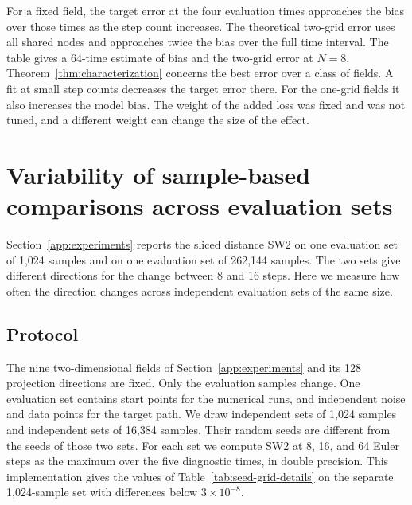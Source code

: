 For a fixed field, the target error at the four evaluation times
approaches the bias over those times as the step count increases. The
theoretical two-grid error uses all shared nodes and approaches twice
the bias over the full time interval. The table gives a 64-time estimate
of bias and the two-grid error at $N=8$. Theorem~\ref{thm:characterization}
concerns the best error over a class of fields. A fit at small step counts
decreases the target error there. For the one-grid fields it also
increases the model bias. The weight of the added loss was fixed and
was not tuned, and a different weight can change the size of the
effect.

\begin{table}[ht]
\centering
\caption{Learned scalar fields: target error at $N$ Euler steps for each
field, model bias, and the two-grid error $E_c+E_f$ of \eqref{eq:errors}
at $N=8$. All values are population $W_2$ distances computed by
quadrature.}
\label{tab:scalar-models}

\end{table}

\section{Variability of sample-based comparisons across evaluation sets}
\label{app:set-variability}
Section~\ref{app:experiments} reports the sliced distance SW2 on one
evaluation set of 1,024 samples and on one evaluation set of 262,144
samples. The two sets give different directions for the change between
8 and 16 steps. Here we measure how often the direction changes across
independent evaluation sets of the same size.\AIassistance

\subsection{Protocol}
The nine two-dimensional fields of Section~\ref{app:experiments} and its
128 projection directions are fixed. Only
the evaluation samples change. One evaluation set contains start points
for the numerical runs, and independent noise and data points for the
target path. We draw \VarSmallSets{} independent sets of 1,024 samples and
\VarMediumSets{} independent sets of 16,384 samples. Their random seeds are different from the seeds of
those two sets. For each set we compute SW2 at 8, 16, and 64 Euler steps
as the maximum over the five diagnostic times, in double precision.
This implementation gives the values of Table~\ref{tab:seed-grid-details} on
the separate 1,024-sample set with differences below $3\times10^{-8}$.

